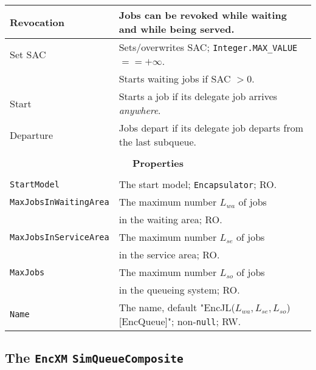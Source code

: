 \begin{tabular}{|l|l|}
	\hline
	Revocation & Jobs can be revoked while waiting and while being served. \\
	\hline
	Set SAC & Sets/overwrites SAC; \lstinline|Integer.MAX_VALUE| $== +\infty$. \\
	& Starts waiting jobs if SAC $> 0$. \\
	\hline
	Start & Starts a job if its delegate job arrives {\em anywhere}. \\
	\hline
	Departure & Jobs depart if its delegate job departs from the last subqueue. \\
	\hline
	\multicolumn{2}{|c|}{} \\
	\multicolumn{2}{|c|}{\bf Properties} \\
	\multicolumn{2}{|c|}{} \\
	\hline
	\lstinline|StartModel|    & The start model; \lstinline|Encapsulator|; RO. \\
	\hline
	\lstinline|MaxJobsInWaitingArea| & The maximum number $L_{wa}$ of jobs \\
	                                 & in the waiting area; RO. \\
	\hline
	\lstinline|MaxJobsInServiceArea| & The maximum number $L_{se}$ of jobs \\
	& in the service area; RO. \\
	\hline
	\lstinline|MaxJobs| & The maximum number $L_{so}$ of jobs \\
	& in the queueing system; RO. \\
	\hline
	\lstinline|Name|          & The name, default "EncJL($L_{wa},L_{se}, L_{so}$)[EncQueue]"; non-\lstinline|null|; RW. \\
	\hline
\end{tabular}

\subsection{The \lstinline{EncXM} \lstinline{SimQueueComposite}}
\label{sec:EncXM}

